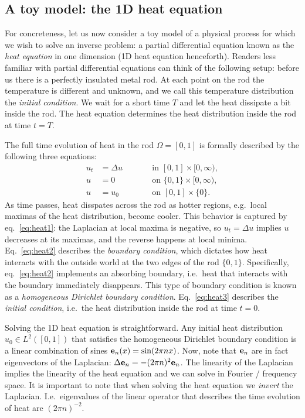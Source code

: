 \subsection{A toy model: the 1D heat equation}\label{subsec:toy}
For concreteness, let us now consider a toy model of a physical
process for which we wish to solve an inverse problem: a partial
differential equation known as the \emph{heat equation} in one
dimension (1D heat equation henceforth). Readers less familiar with
partial differential equations can think of the following setup:
before us there is a perfectly insulated metal rod. At each point on
the rod the temperature is different and unknown, and we call this
temperature distribution the \emph{initial condition}. We wait for a
short time $T$ and let the heat dissipate a bit inside the rod. The
heat equation determines the heat distribution inside the rod at time
$t=T$.

The full time evolution of heat in the rod $\Omega=[0,1]$ is formally
described by the following three equations:
\begin{subequations}%
  \begin{alignat}{2}
    u_t &= \Delta u &&\qquad \text{in } [0,1] \times [0,\infty), \label{eq:heat1}\\
    u &= 0 &&\qquad \text{on } \{0, 1\} \times [0,\infty), \label{eq:heat2}\\
    u &= u_0 &&\qquad \text{on }[0,1] \times \{0\}. \label{eq:heat3}
  \end{alignat}
\end{subequations}
As time passes, heat disspates across the rod as hotter regions,
e.g.~local maximas of the heat distribution, become cooler. This
behavior is captured by eq.~\eqref{eq:heat1}: the Laplacian at local
maxima is negative, so $u_t = \Delta u$ implies $u$ decreases at its
maximas, and the reverse happens at local minima. Eq.~\eqref{eq:heat2}
describes the \emph{boundary condition}, which dictates how heat
interacts with the outside world at the two edges of the rod
$\{0,1\}$. Specifically, eq.~\eqref{eq:heat2} implements an absorbing
boundary, i.e.~heat that interacts with the boundary immediately
disappears. This type of boundary condition is known as a
\emph{homogeneous Dirichlet boundary condition}. Eq.~\eqref{eq:heat3}
describes the \emph{initial condition}, i.e.~the heat distribution
inside the rod at time $t=0$.

Solving the 1D heat equation is straightforward. Any initial heat
distribution $u_0\in L^2([0,1])$ that satisfies the homogeneous
Dirichlet boundary condition is a linear combination of sines
$\mathbf{e}_n(x) = \sin(2\pi n x)$. Now, note that $\mathbf{e}_n$ are in fact
eigenvectors of the Laplacian: $\Delta \mathbf{e}_n = -(2\pi n)^2\mathbf{e}_n$. The
linearity of the Laplacian implies the linearity of the heat equation
and we can solve in Fourier / frequency space. It is important to note
that when solving the heat equation we \emph{invert} the
Laplacian. I.e.~eigenvalues of the linear operator that describes the
time evolution of heat are $(2\pi n)^{-2}$.

